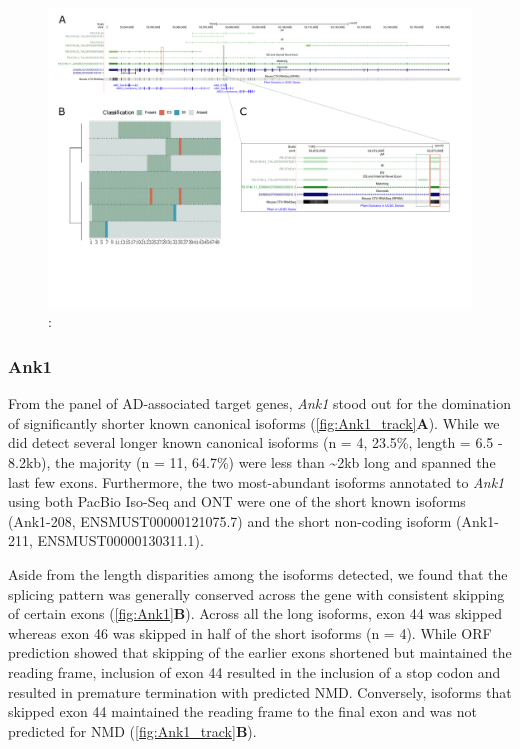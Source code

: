 \begin{landscape}
	\begin{figure}[htp]
		\begin{center}
			\includegraphics[page=9,trim={0 1cm 0 0},scale = 0.85]{Figures/TargetGenes_Annotation_Landscape.pdf}
		\end{center}
		\captionsetup{width=0.95\textwidth}
		\caption[RNA-Seq defined transcriptome]%
		{\textbf{}: }   
		\label{fig:rhbdf2}
	\end{figure}
\end{landscape}

\newpage
\subsubsection{Ank1} 
From the panel of AD-associated target genes, \textit{Ank1} stood out for the domination of significantly shorter known canonical isoforms (\cref{fig:Ank1_track}\textbf{A}). While we did detect several longer known canonical isoforms (n = 4, 23.5\%, length = 6.5 - 8.2kb), the majority (n = 11, 64.7\%) were less than \textasciitilde 2kb long and spanned the last few exons. Furthermore, the two most-abundant isoforms annotated to \textit{Ank1} using both PacBio Iso-Seq and ONT were one of the short known isoforms (Ank1-208, ENSMUST00000121075.7) and the short non-coding isoform (Ank1-211, ENSMUST00000130311.1). %

Aside from the length disparities among the isoforms detected, we found that the splicing pattern was generally conserved across the gene with consistent skipping of certain exons (\cref{fig:Ank1}\textbf{B}). Across all the long isoforms, exon 44 was skipped whereas exon 46 was skipped in half of the short isoforms (n = 4). While ORF prediction showed that skipping of the earlier exons shortened but maintained the reading frame, inclusion of exon 44 resulted in the inclusion of a stop codon and resulted in premature termination with predicted NMD. Conversely, isoforms that skipped exon 44 maintained the reading frame to the final exon and was not predicted for NMD  
(\cref{fig:Ank1_track}\textbf{B}).   

